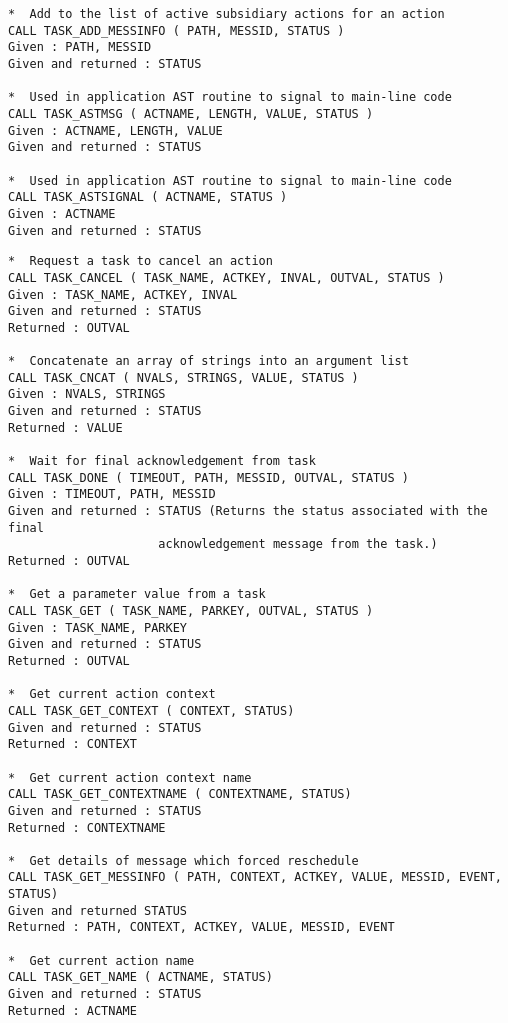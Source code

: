 \documentclass[twoside,11pt]{article}
\renewcommand{\_}{\texttt{\symbol{95}}}
\begin{document}
\begin{verbatim}
*  Add to the list of active subsidiary actions for an action
CALL TASK_ADD_MESSINFO ( PATH, MESSID, STATUS )
Given : PATH, MESSID
Given and returned : STATUS

*  Used in application AST routine to signal to main-line code
CALL TASK_ASTMSG ( ACTNAME, LENGTH, VALUE, STATUS )
Given : ACTNAME, LENGTH, VALUE
Given and returned : STATUS

*  Used in application AST routine to signal to main-line code
CALL TASK_ASTSIGNAL ( ACTNAME, STATUS )
Given : ACTNAME
Given and returned : STATUS
\end{verbatim}
\newpage
\begin{verbatim}
*  Request a task to cancel an action
CALL TASK_CANCEL ( TASK_NAME, ACTKEY, INVAL, OUTVAL, STATUS )
Given : TASK_NAME, ACTKEY, INVAL
Given and returned : STATUS
Returned : OUTVAL

*  Concatenate an array of strings into an argument list
CALL TASK_CNCAT ( NVALS, STRINGS, VALUE, STATUS )
Given : NVALS, STRINGS
Given and returned : STATUS
Returned : VALUE

*  Wait for final acknowledgement from task
CALL TASK_DONE ( TIMEOUT, PATH, MESSID, OUTVAL, STATUS )
Given : TIMEOUT, PATH, MESSID
Given and returned : STATUS (Returns the status associated with the final
                     acknowledgement message from the task.)
Returned : OUTVAL

*  Get a parameter value from a task
CALL TASK_GET ( TASK_NAME, PARKEY, OUTVAL, STATUS )
Given : TASK_NAME, PARKEY
Given and returned : STATUS
Returned : OUTVAL

*  Get current action context
CALL TASK_GET_CONTEXT ( CONTEXT, STATUS)
Given and returned : STATUS
Returned : CONTEXT

*  Get current action context name
CALL TASK_GET_CONTEXTNAME ( CONTEXTNAME, STATUS)
Given and returned : STATUS
Returned : CONTEXTNAME

*  Get details of message which forced reschedule
CALL TASK_GET_MESSINFO ( PATH, CONTEXT, ACTKEY, VALUE, MESSID, EVENT, STATUS)
Given and returned STATUS
Returned : PATH, CONTEXT, ACTKEY, VALUE, MESSID, EVENT

*  Get current action name
CALL TASK_GET_NAME ( ACTNAME, STATUS)
Given and returned : STATUS
Returned : ACTNAME
\end{verbatim}
\newpage
\end{document}
